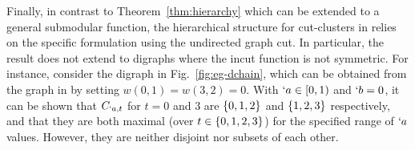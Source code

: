 Finally, in contrast to Theorem~\ref{thm:hierarchy} which can be extended to a general submodular function,
the hierarchical structure for cut-clusters in \cite[Lemma~3.9]{flake:cut-clustering} relies on the specific
formulation using the undirected graph cut. In particular, the result does not extend to digraphs
where the incut function is not symmetric. For instance, consider the digraph in 
Fig.~\ref{fig:eg-dchain}, which can be obtained from the graph in 
by setting $w(0,1)=w(3,2)=0$.
With $`a\in [0,1)$ and $`b=0$, it can be shown that $C_{`a,t}$ for $t=0$ and $3$ are
$\{0,1,2\}$ and $\{1,2,3\}$ respectively, and that they are both maximal (over $t\in \{0,1,2,3\}$) for the specified range of $`a$ values.
However, they are neither disjoint nor subsets of each other.










